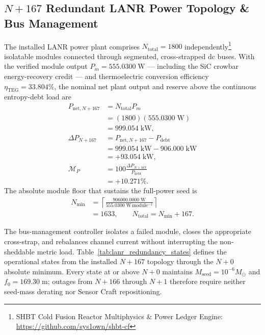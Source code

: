 \documentclass[10pt,twocolumn]{IEEEtran}
\newcommand{\Msun}{M_{\odot}}
\begin{document}
\subsection{$N+167$ Redundant LANR Power Topology \& Bus Management}

The installed LANR power plant comprises $N_{\mathrm{total}}=1800$ independently\footnote{SHBT Cold Fusion Reactor Multiphysics \& Power Ledger Engine: \url{https://github.com/sys1own/shbt-cf}}
isolatable modules connected through segmented, cross-strapped dc buses.  With
the verified module output $P_m=555.0300\;\mathrm{W}$ --- including the SiC
crowbar energy-recovery credit --- and thermoelectric
conversion efficiency $\eta_{\mathrm{TEG}}=33.804\%$, the nominal net plant
output and reserve above the continuous entropy-debt load are
\begin{equation}
\begin{aligned}
P_{\mathrm{net},N+167}
&=N_{\mathrm{total}}P_m \\
&=(1800)(555.0300\;\mathrm{W})
 \\
&=999.054\;\mathrm{kW}, \\
\Delta P_{N+167}
&=P_{\mathrm{net},N+167}-P_{\mathrm{debt}} \\
&=999.054\;\mathrm{kW}-906.000\;\mathrm{kW} \\
&=+93.054\;\mathrm{kW}, \\
\mathcal M_P
&=100\frac{\Delta P_{N+167}}{P_{\mathrm{debt}}} \\
&=+10.271\%.
\end{aligned}
\label{eq:n_plus_14_margin}
\end{equation}
The absolute module floor that sustains the full-power seed is
\begin{equation}
\begin{aligned}
N_{\min}
&=\left\lceil\frac{906000.0000\;\mathrm{W}}
{555.0300\;\mathrm{W\,module^{-1}}}\right\rceil \\
&=1633,
\qquad
N_{\mathrm{total}}=N_{\min}+167.
\end{aligned}
\label{eq:lanr_minimum_count}
\end{equation}

The bus-management controller isolates a failed module, closes the appropriate
cross-strap, and rebalances channel current without interrupting the
non-sheddable metric load.  Table~\ref{tab:lanr_redundancy_states} defines the
operational states from the installed $N+167$ topology through the $N+0$
absolute minimum.  Every state at or above $N+0$ maintains
$M_{\mathrm{seed}}=10^{-6}\Msun$ and $f_0=169.30\;\mathrm{m}$; outages from
$N+166$ through $N+1$ therefore require neither seed-mass derating nor Sensor
Craft repositioning.
\end{document}

